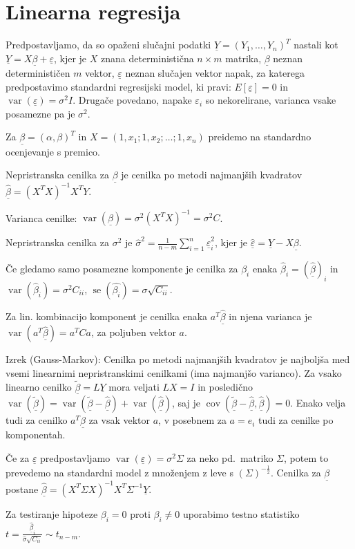 \documentclass[11pt,a4paper]{amsart}
\theoremstyle{definition} %
\theoremstyle{plain} %
\newcommand{\Y}{\underline{Y}}
\newcommand{\ubeta}{\ensuremath{\underline{\beta}}}
\newcommand{\ueps}{\ensuremath{\underline{\varepsilon}}}
\DeclareMathOperator{\cov}{cov}
\DeclareMathOperator{\var}{var}
\DeclareMathOperator{\se}{se}
\begin{document}
\section*{Linearna regresija}
Predpostavljamo, da so opaženi slučajni podatki $\Y = (Y_1, \dots, Y_n)^T$ nastali kot
$\Y = X \ubeta + \ueps$, kjer je $X$ znana deterministična $n \times m$ matrika, $\ubeta$
neznan determinističen $m$ vektor, $\ueps$ neznan slučajen vektor napak, za katerega
predpostavimo standardni regresijski model, ki pravi: $E[\ueps] = 0$ in
$\var(\ueps) = \sigma^2 I$.  Drugače povedano, napake $\varepsilon_i$ so
nekorelirane, varianca vsake posamezne pa je $\sigma^2$.

Za $\ubeta = (\alpha, \beta)^T$ in $X = (1, x_1; 1, x_2; \dots; 1, x_n)$
preidemo na standardno ocenjevanje s premico.

Nepristranska cenilka za $\ubeta$ je cenilka po metodi najmanjših kvadratov
$\hat{\ubeta} = (X^TX)^{-1}X^TY$.

Varianca cenilke: $\var(\ubeta) = \sigma^2(X^TX)^{-1} = \sigma^2C$.

Nepristranska cenilka za $\sigma^2$ je $\hat{\sigma}^2 = \frac{1}{n-m}
\sum_{i=1}^n \hat{\ueps}_i^2$, kjer je $\hat{\ueps} = \Y - X\ubeta$.

Če gledamo samo posamezne komponente je cenilka za $\beta_i$ enaka
$\hat{\beta}_i = (\hat{\ubeta})_i$ in $\var(\hat{\beta}_i) = \sigma^2C_{ii}$,
$\se(\hat{\beta_i}) = \sigma \sqrt{C_{ii}}$.

Za lin. kombinacijo komponent je cenilka enaka $a^T\hat{\ubeta}$ in njena
varianca je $\var(a^T\hat{\ubeta}) = a^T C a$, za poljuben vektor $a$.

Izrek (Gauss-Markov): Cenilka po metodi najmanjših kvadratov je najboljša med
vsemi linearnimi nepristranskimi cenilkami (ima najmanjšo varianco). Za vsako
linearno cenilko $\tilde{\ubeta} = L\Y$ mora veljati $LX = I$ in posledično
$\var(\tilde{\ubeta}) = \var(\tilde{\ubeta} - \hat{\ubeta}) +
\var(\hat{\ubeta})$, saj je $\cov(\tilde{\ubeta} - \hat{\ubeta}, \hat{\ubeta}) =
0$. Enako velja tudi za cenilko $a^T\hat{\ubeta}$ za vsak vektor $a$, v posebnem
za $a = e_i$ tudi za cenilke po komponentah.

Če za $\ueps$ predpostavljamo $\var(\ueps) = \sigma^2\Sigma$ za neko pd.\
matriko $\Sigma$, potem to prevedemo na standardni model z množenjem z leve s
$(\Sigma)^{-\frac12}$. Cenilka za $\ubeta$ postane $\hat{\ubeta} =
(X^T\Sigma X)^{-1}X^T\Sigma^{-1} \Y$.

Za testiranje hipoteze $\beta_i = 0$ proti $\beta_i \neq 0$ uporabimo testno
statistiko $t = \frac{\hat{\ubeta}_i}{\hat{\sigma} \sqrt{C_{ii}}} \sim t_{n-m}$.
\end{document}
